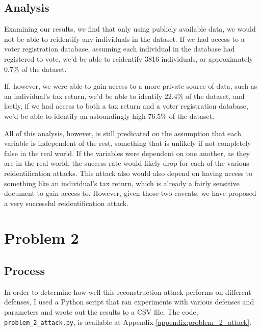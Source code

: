 \documentclass[12pt]{article}
\def\cl{\lstinline}
\begin{document}
\subsection{Analysis}

\noindent

Examining our results, we find that only using publicly available data, we would not be able to reidentify any individuals in the dataset. If we had access to a voter registration database, assuming each individual in the database had registered to vote, we'd be able to reidentify 3816 individuals, or approximately $0.7\%$ of the dataset.

\medskip

If, however, we were able to gain access to a more private source of data, such as an individual's tax return, we'd be able to identify $22.4\%$ of the dataset, and lastly, if we had access to both a tax return and a voter registration database, we'd be able to identify an astoundingly high $76.5\%$ of the dataset.

\medskip

All of this analysis, however, is still predicated on the assumption that each variable is independent of the rest, something that is unlikely if not completely false in the real world. If the variables were dependent on one another, as they are in the real world, the success rate would likely drop for each of the various reidentification attacks. This attack also would also depend on having access to something like an individual's tax return, which is already a fairly sensitive document to gain access to. However, given those two caveats, we have proposed a very successful reidentification attack.

\newpage

\section{Problem 2}

\subsection{Process}

\noindent

In order to determine how well this reconstruction attack performs on different defenses, I used a Python script that ran experiments with various defenses and parameters and wrote out the results to a CSV file. The code, \cl{problem_2_attack.py}, is available at Appendix \ref{appendix:problem_2_attack}.
\end{document}
